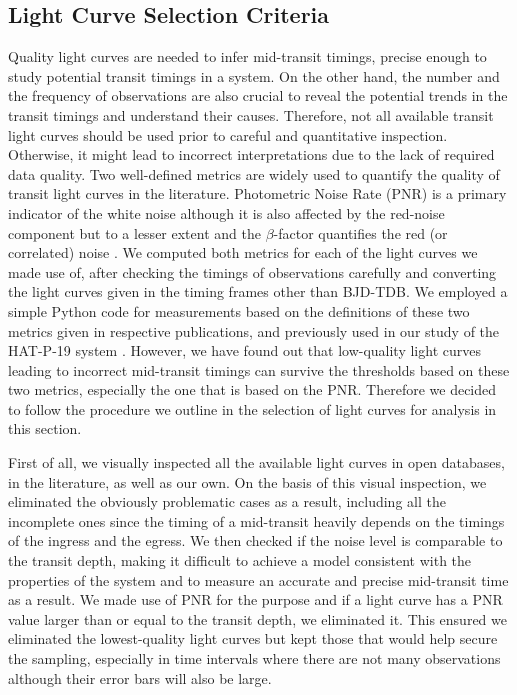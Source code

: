 \documentclass[a4paper,fleqn,usenatbib]{mnras}
\begin{document}
\subsection{Light Curve Selection Criteria}
\label{subsec:criteria}
Quality light curves are needed to infer mid-transit timings, precise enough to study potential transit timings in a system. On the other hand, the number and the frequency  of observations are also crucial to reveal the potential trends in the transit timings and understand their causes. Therefore, not all available transit light curves should be used prior to careful and quantitative inspection. Otherwise, it might lead to incorrect interpretations due to the lack of required data quality. Two well-defined metrics are widely used to quantify the quality of transit light curves in the literature. Photometric Noise Rate (PNR) \citep{2011AJ....142...84F} is a primary indicator of the white noise although it is also affected by the red-noise component but to a lesser extent and the $\beta$-factor quantifies the red (or correlated) noise \citep{2008ApJ...683.1076W}. We computed both metrics for each of the light curves we made use of, after checking the timings of observations carefully and converting the light curves given in the timing frames other than BJD-TDB. We employed a simple Python code for measurements based on the definitions of these two metrics given in respective publications, and previously used in our study of the HAT-P-19 system \citep{2020MNRAS.496.4174B}. However, we have found out that low-quality light curves leading to incorrect mid-transit timings can survive the thresholds based on these two metrics, especially the one that is based on the PNR. Therefore we decided to follow the procedure we outline in the selection of light curves for analysis in this section.

First of all, we visually inspected all the available light curves in open databases, in the literature, as well as our own. On the basis of this visual inspection, we eliminated the obviously problematic cases as a result, including all the incomplete ones since the timing of a mid-transit heavily depends on the timings of the ingress and the egress. We then checked if the noise level is comparable to the transit depth, making it difficult to achieve a model consistent with the properties of the system and to measure an accurate and precise mid-transit time as a result. We made use of PNR for the purpose and if a light curve has a PNR value larger than or equal to the transit depth, we eliminated it. This ensured we eliminated the lowest-quality light curves but kept those that would help secure the sampling, especially in time intervals where there are not many observations although their error bars will also be large.
\end{document}
